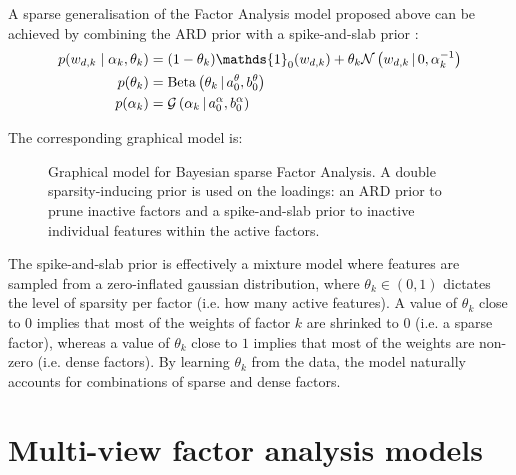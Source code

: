 A sparse generalisation of the Factor Analysis model proposed above can be achieved by combining the ARD prior with a spike-and-slab prior \cite{Mitchell1988,Titsias2011}:
\begin{align}
	p(w_{d,k} \mid \alpha_k,\theta_k) &= (1-\theta_k) \mathds{1}_0(w_{d,k}) + \theta_k \Ndist{w_{d,k}}{0, \alpha_k^{-1}} \\
	p(\theta_k) &= \Bdist{\theta_k}{a_0^\theta,b_0^\theta} \\
	p(\alpha_k) &= \Gdist{\alpha_k}{a_0^\alpha, b_0^\alpha}
\end{align}

The corresponding graphical model is:

\begin{figure}[H] \begin{center}
	
	\label{fig:bayesianFA}
	\caption{Graphical model for Bayesian sparse Factor Analysis. A double sparsity-inducing prior is used on the loadings: an ARD prior to prune inactive factors and a spike-and-slab prior to inactive individual features within the active factors.}
\end{center} \end{figure}

The spike-and-slab prior is effectively a mixture model where features are sampled from a zero-inflated gaussian distribution, where $\theta_k \in (0,1)$ dictates the level of sparsity per factor (i.e. how many active features). A value of $\theta_k$ close to $0$ implies that most of the weights of factor $k$ are shrinked to $0$ (i.e. a sparse factor), whereas a value of $\theta_k$ close to $1$ implies that most of the weights are non-zero (i.e. dense factors). By learning $\theta_k$ from the data, the model naturally accounts for combinations of sparse and dense factors.





\section{Multi-view factor analysis models}

